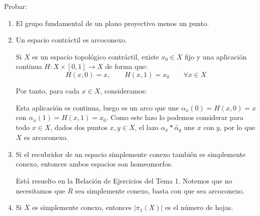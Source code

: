 \documentclass[12pt]{article}
\begin{document}
    \begin{ejercicio}
        Probar:
        \begin{enumerate}
            \item El grupo fundamental de un plano proyectivo menos un punto.
            \item Un espacio contráctil es arcoconexo.

                Si $X$ es un espacio topológico contráctil, existe $x_0\in X$ fijo y una aplicación continua $H:X\times [0,1]\to X$ de forma que:
                \begin{equation*}
                    H(x,0) = x, \qquad H(x,1) = x_0 \qquad \forall x\in X
                \end{equation*}
                
                Por tanto, para cada $x\in X$, consideramos:

                Esta aplicación es continua, luego es un arco que une $\alpha_x(0) = H(x,0) = x$ con $\alpha_x(1) = H(x,1) = x_0$. Como este lazo lo podemos considerar para todo $x\in X$, dados dos puntos $x,y\in X$, el lazo $\alpha_x\ast \widetilde{\alpha_y}$ une $x$ con $y$, por lo que $X$ es arcoconexo.
            \item Si el recubridor de un espacio simplemente conexo también es simplemente conexo, entonces ambos espacios son homeomorfos.

                Está resuelto en la Relación de Ejercicios del Tema 1. Notemos que no necesitamos que $R$ sea simplemente conexo, basta con que sea arcoconexo.
            \item Si $\overline{X}$ es simplemente conexo, entonces $|\pi_1(X)|$ es el número de hojas.
        \end{enumerate}
    \end{ejercicio}
\end{document}
